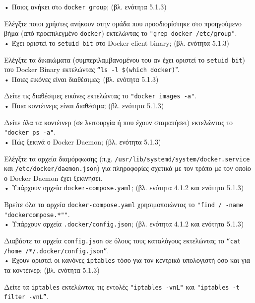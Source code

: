 • Ποιος ανήκει στo \texttt{\textlatin{docker group}}; (βλ. ενότητα 5.1.3)

Ελέγξτε ποιοι χρήστες ανήκουν στην ομάδα που προσδιορίστηκε στο προηγούμενο βήμα
(από προεπιλεγμένο \texttt{\textlatin{docker}}) εκτελώντας το
\texttt{\textlatin{"grep docker /etc/group"}}. \\

• Έχει οριστεί το \texttt{\textlatin{setuid bit}} στο
\textlatin{Docker client binary}; (βλ. ενότητα 5.1.3)

Ελέγξτε τα δικαιώματα (συμπεριλαμβανομένου του αν έχει οριστεί το
\texttt{\textlatin{setuid bit}}) του \textlatin{Docker Binary} εκτελώντας
\texttt{\textlatin{“ls -l \$(which docker)}}”. \\

• Ποιες εικόνες είναι διαθέσιμες; (βλ. ενότητα 5.1.3)

Δείτε τις διαθέσιμες εικόνες εκτελώντας το
\texttt{\textlatin{"docker images -a"}}. \\

• Ποια κοντέινερς είναι διαθέσιμα; (βλ. ενότητα 5.1.3)

Δείτε όλα τα κοντέινερ (σε λειτουργία ή που έχουν σταματήσει) εκτελώντας το
\texttt{\textlatin{"docker ps -a"}}. \\


• Πώς ξεκινά ο \textlatin{Docker Daemon}; (βλ. ενότητα 5.1.3)

Ελέγξτε τα αρχεία διαμόρφωσης (π.χ.
\texttt{\textlatin{/usr/lib/systemd/system/docker.service}} και
\texttt{\textlatin{/etc/docker/daemon.json}}) για πληροφορίες σχετικά με τον
τρόπο με τον οποίο ο \textlatin{Docker Daemon} έχει ξεκινήσει. \\

• Υπάρχουν αρχεία \texttt{\textlatin{docker-compose.yaml}}; (βλ. ενότητα 4.1.2
και ενότητα 5.1.3)

Βρείτε όλα τα αρχεία \texttt{\textlatin{docker-compose.yaml}} χρησιμοποιώντας το
\texttt{\textlatin{"find / -name "dockercompose.*""}}. \\

• Υπάρχουν αρχεία \texttt{\textlatin{.docker/config.json}}; (βλ. ενότητα 4.1.2
και ενότητα 5.1.3)

Διαβάστε τα αρχεία \texttt{\textlatin{config.json}} σε όλους τους καταλόγους
εκτελώντας το \texttt{\textlatin{“cat /home /*/.docker/config.json”}}. \\


• Έχουν οριστεί οι κανόνες \texttt{\textlatin{iptables}} τόσο για τον κεντρικό
υπολογιστή όσο και για τα κοντέινερ; (βλ. ενότητα 5.1.3)

Δείτε τα \texttt{\textlatin{iptables}} εκτελώντας τις εντολές
\texttt{\textlatin{"iptables -vnL"}} και
\texttt{\textlatin{"iptables -t filter -vnL”}}.


